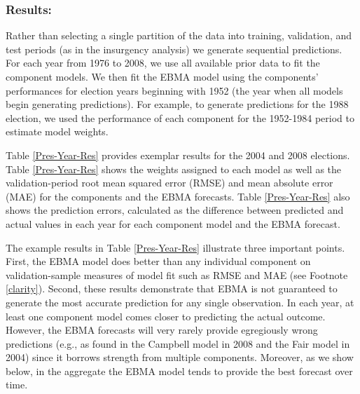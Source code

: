 \subsubsection{Results:}

Rather than selecting a single partition of the data into training,
validation, and test periods (as in the insurgency analysis) we
generate sequential predictions.  For each year from 1976 to 2008, we
use all available prior data to fit the component models.  We then fit the EBMA model using the components'
performances for election years beginning with 1952 (the year when all
models begin generating predictions).  For example, to generate
predictions for the 1988 election, we used the performance of each
component for the 1952-1984 period to estimate model weights.




 Table \ref{Pres-Year-Res} provides exemplar results for the 2004 and
 2008 elections.  Table \ref{Pres-Year-Res} shows the weights assigned
 to each model as well as the validation-period root mean squared
 error (RMSE) and mean absolute error (MAE) for the components and the
 EBMA forecasts. Table \ref{Pres-Year-Res} also shows
 the prediction errors, calculated as the difference between predicted
 and actual values in each year for each component model and the EBMA
 forecast.

 The example results in Table \ref{Pres-Year-Res} illustrate three
 important points.  First, the EBMA model does better than any
 individual component on validation-sample measures of model fit such
 as RMSE and MAE (see Footnote \ref{clarity}).  Second, these results
 demonstrate that EBMA is not guaranteed to generate the most accurate
 prediction for any single observation.  In each year, at least one
 component model comes closer to predicting the actual outcome.
 However, the EBMA forecasts will very rarely provide egregiously
 wrong predictions (e.g., as found in the Campbell model in 2008 and
 the Fair model in 2004) since it borrows strength from multiple
 components.  Moreover, as we show below, in the aggregate the EBMA
 model tends to provide the best forecast over time.

